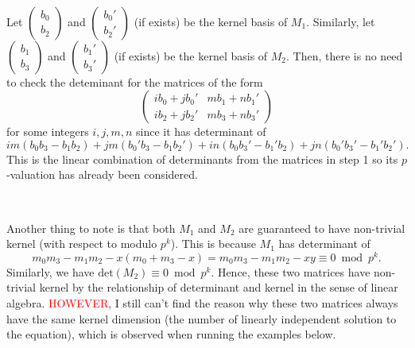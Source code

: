 \documentclass[letterpaper,12pt]{article}
\begin{document}
\

Let $\begin{pmatrix}b_0 \\ b_2 \end{pmatrix}$ and 
$\begin{pmatrix}b_0' \\ b_2' \end{pmatrix}$ (if exists) be the kernel basis of $M_1$.
Similarly, let $\begin{pmatrix}b_1 \\ b_3 \end{pmatrix}$ and 
$\begin{pmatrix}b_1' \\ b_3' \end{pmatrix}$ (if exists) be the kernel basis of $M_2$.
Then, there is no need to check the deteminant for the matrices of the form 
\[
\begin{pmatrix}
ib_0+jb_0' & mb_1+nb_1' \\
ib_2+jb_2' & mb_3+nb_3'
\end{pmatrix}
\]
for some integers $i,j,m,n$ since it has determinant of
\[
im(b_0b_3 - b_1b_2) + jm(b_0'b_3 - b_1b_2')
+ in(b_0b_3' - b_1'b_2) + jn(b_0'b_3' - b_1'b_2') .
\]
This is the linear combination of determinants from the matrices in step 1
so its $p$-valuation has already been considered.

\

Another thing to note is that both $M_1$ and $M_2$
are guaranteed to have non-trivial kernel (with respect to modulo $p^k$).
This is because $M_1$ has determinant of 
\[
m_0m_3 - m_1m_2 - x(m_0 + m_3 - x)
= m_0m_3 - m_1m_2 - xy
\equiv 0 \bmod p^k.
\]
Similarly, we have $\text{det}(M_2) \equiv 0 \bmod p^k$.
Hence, these two matrices have non-trivial kernel by the relationship 
of determinant and kernel in the sense of linear algebra.
\textcolor{red}{HOWEVER}, I still can't find the reason why 
these two matrices always have the same kernel dimension
(the number of linearly independent solution to the equation),
which is observed when running the examples below.

\
\end{document}
